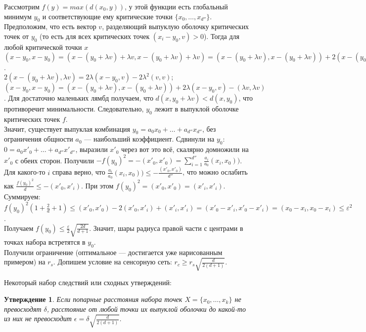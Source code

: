 \documentclass[english,12pt]{article}
\newcounter{stmcounter}[section]
\numberwithin{equation}{section}
\newtheorem{proposition}[stmcounter]{Утверждение}
\theoremstyle{definition}
\theoremstyle{remark}
\renewcommand{\leq}{\leqslant}
\renewcommand{\geq}{\geqslant}
\begin{document}
Рассмотрим $f(y) = max(d(x_0, y))$, у этой функции есть глобальный минимум $y_0$ и соответствующие ему критические точки $\{x_0,\ldots,x_{d''}\}$. Предположим, что есть вектор $v$, разделяющий выпуклую оболочку критических точек от $y_0$ (то есть для всех критических точек $(x_i-y_0, v) > 0$). Тогда для любой критической точки $x$ $(x-y_0, x-y_0) = (x-(y_0 + \lambda v) + \lambda v, x-(y_0 + \lambda v) + \lambda v) = (x-(y_0 + \lambda v), x-(y_0 + \lambda v)) + 2(x-(y_0 + \lambda v), \lambda v) + (\lambda v, \lambda v)$.\\

$2(x-(y_0 + \lambda v), \lambda v) = 2\lambda(x-y_0,v) - 2\lambda^2(v,v)$; $(x-y_0, x-y_0) = (x-(y_0 + \lambda v), x-(y_0 + \lambda v)) + 2\lambda(x-y_0,v) - (\lambda v, \lambda v)$. Для достаточно маленьких лямбд получаем, что $d(x,y_0 + \lambda v) < d(x,y_0)$, что противоречит минимальности. Следовательно, $y_0$ лежит в выпуклой оболочке критических точек $f$.\\

Значит, существует выпуклая комбинация $y_0 = a_0x_0 + \ldots + a_{d''}x_{d''}$, без ограничения общности $a_0$ --- наибольший коэффициент. Сдвинули на $y_0$: $0 = a_0x'_0 + \ldots + a_{d''}x'_{d''}$, выразили $x'_0$ через вот это всё, скалярно домножили на $x'_0$ с обеих сторон. Получили $-f(y_0)^2 = -(x'_0,x'_0) = \sum_{i=1}^{d''}\frac{a_i}{a_0}(x_i,x_0))$.\\

Для какого-то $i$ справа верно, что $\frac{a_i}{a_0}(x_i,x_0)) \leq -\frac{(x'_0,x'_0)}{d''}$, что можно ослабить как $\frac{f(y_0)^2}{d} \leq -(x'_0,x'_i)$. При этом $f(y_0)^2 = (x'_0,x'_0) = (x'_i,x'_i)$.\\

Суммируем: $f(y_0)^2(1+\frac{2}{d}+1) \leq (x'_0,x'_0) - 2(x'_0,x'_i) + (x'_i,x'_i) = (x'_0-x'_i, x'_0-x'_i) = (x_0-x_i, x_0-x_i) \leq \varepsilon^2$.\\
Получаем $f(y_0) \leq \frac{\varepsilon}{2}\sqrt{\frac{2d}{d+1}}$. Значит, шары радиуса правой части с центрами в точках набора встретятся в $y_0$.\\

Получили ограничение (оптимальное --- достигается уже нарисованным примером) на $r_s$.
Допишем условие на сенсорную сеть: $r_c \geq r_s\sqrt{\frac{d}{2(d+1)}}$.

Некоторый набор следствий или сходных утверждений:

\begin{proposition}
  Если попарные расстояния набора точек $X = \{x_0, \ldots, x_k\}$ не превосходят $\delta$, расстояние от любой точки их выпуклой оболочки до какой-то из них не превосходит $\epsilon = \delta\sqrt{\frac{d}{2(d+1)}}$.
\end{proposition}
\end{document}
